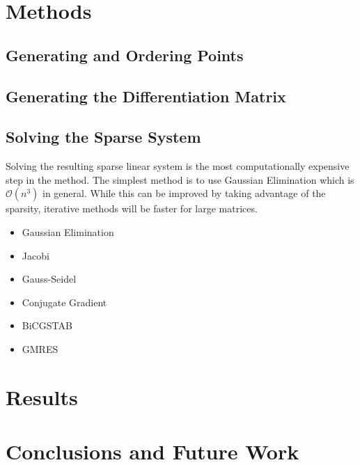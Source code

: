 \documentclass[12pt]{article}
\begin{document}
\section{Methods}

\subsection{Generating and Ordering Points}

\subsection{Generating the Differentiation Matrix}

\subsection{Solving the Sparse System}

	Solving the resulting sparse linear system is the most computationally expensive step in the method. The simplest method is to use Gaussian Elimination which is $\mathcal{O}(n^3)$ in general. While this can be improved by taking advantage of the sparsity, iterative methods will be faster for large matrices.

	\begin{itemize}
		\item Gaussian Elimination
		\item Jacobi
		\item Gauss-Seidel
		\item Conjugate Gradient
		\item BiCGSTAB
		\item GMRES
	\end{itemize}

\section{Results}

\section{Conclusions and Future Work}

 
\pagebreak
 
\printbibliography
\end{document}
